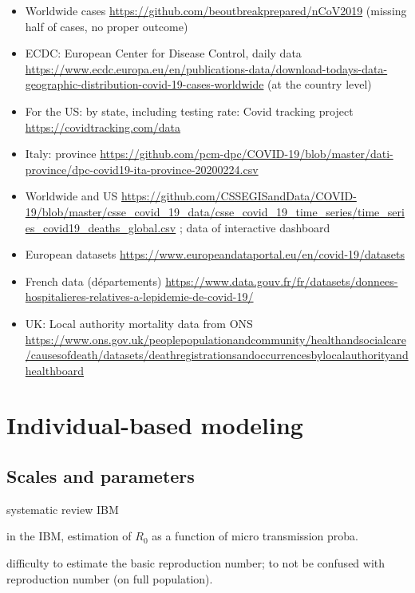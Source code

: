 \documentclass[10pt]{article}
\begin{document}
\begin{itemize}
	\item Worldwide cases \cite{xu2020epidemiological} \url{https://github.com/beoutbreakprepared/nCoV2019} (missing half of cases, no proper outcome)
	\item ECDC: European Center for Disease Control, daily data \url{https://www.ecdc.europa.eu/en/publications-data/download-todays-data-geographic-distribution-covid-19-cases-worldwide} (at the country level)
	\item For the US: by state, including testing rate: Covid tracking project \url{https://covidtracking.com/data}
	\item Italy: province \url{https://github.com/pcm-dpc/COVID-19/blob/master/dati-province/dpc-covid19-ita-province-20200224.csv}
	\item Worldwide and US \url{https://github.com/CSSEGISandData/COVID-19/blob/master/csse\_covid\_19\_data/csse\_covid\_19\_time\_series/time\_series\_covid19\_deaths\_global.csv} ; data of interactive dashboard \cite{dong2020interactive}
	\item European datasets \url{https://www.europeandataportal.eu/en/covid-19/datasets}
	\item French data (d{\'e}partements) \url{https://www.data.gouv.fr/fr/datasets/donnees-hospitalieres-relatives-a-lepidemie-de-covid-19/}
	\item UK: Local authority mortality data from ONS \url{https://www.ons.gov.uk/peoplepopulationandcommunity/healthandsocialcare/causesofdeath/datasets/deathregistrationsandoccurrencesbylocalauthorityandhealthboard}
\end{itemize}


	
	
\section{Individual-based modeling}

\subsection{Scales and parameters}

\cite{willem2017lessons} systematic review IBM

\cite{kuylen2017social} in the IBM, estimation of $R_0$ as a function of micro transmission proba.

\cite{delamater2019complexity} difficulty to estimate the basic reproduction number; to not be confused with reproduction number (on full population).
\end{document}
